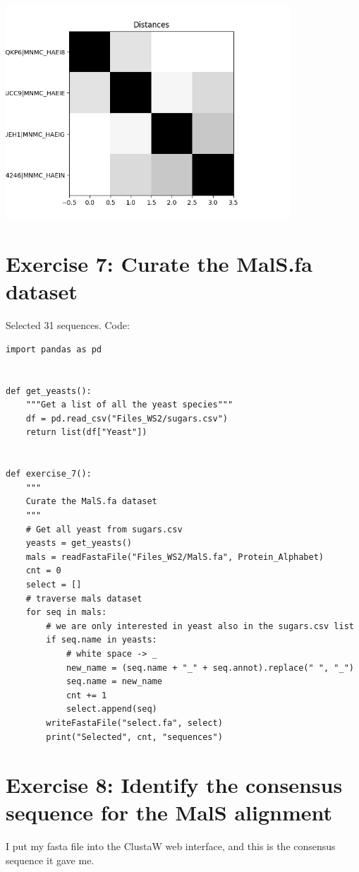 \documentclass{article} %
\begin{document}
\includegraphics[width=0.8\textwidth]{poisson.png}

\section{Exercise 7: Curate the MalS.fa dataset}

Selected 31 sequences. Code:

\begin{verbatim}
import pandas as pd


def get_yeasts():
    """Get a list of all the yeast species"""
    df = pd.read_csv("Files_WS2/sugars.csv")
    return list(df["Yeast"])


def exercise_7():
    """
    Curate the MalS.fa dataset
    """
    # Get all yeast from sugars.csv
    yeasts = get_yeasts()
    mals = readFastaFile("Files_WS2/MalS.fa", Protein_Alphabet)
    cnt = 0
    select = []
    # traverse mals dataset
    for seq in mals:
        # we are only interested in yeast also in the sugars.csv list
        if seq.name in yeasts:
            # white space -> _
            new_name = (seq.name + "_" + seq.annot).replace(" ", "_")
            seq.name = new_name
            cnt += 1
            select.append(seq)
        writeFastaFile("select.fa", select)
        print("Selected", cnt, "sequences")
\end{verbatim}


\section{Exercise 8: Identify the consensus sequence for the MalS alignment}

I put my fasta file into the ClustaW web interface, and this is the consensus sequence it gave me.
\end{document}

